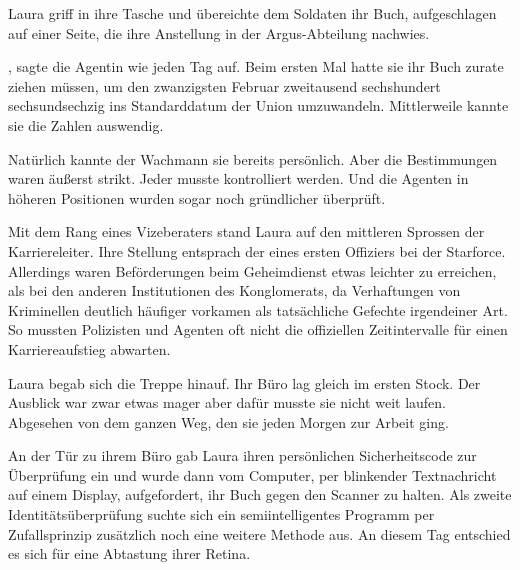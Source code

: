 Laura griff in ihre Tasche und übereichte dem Soldaten ihr Buch, aufgeschlagen auf einer Seite, die ihre Anstellung in der Argus-Abteilung nachwies.

\par

, sagte die Agentin wie jeden Tag auf. Beim ersten Mal hatte sie ihr Buch zurate ziehen müssen, um den zwanzigsten Februar zweitausend sechshundert sechsundsechzig ins Standarddatum der Union umzuwandeln. Mittlerweile kannte sie die Zahlen auswendig.

\par

Natürlich kannte der Wachmann sie bereits persönlich. Aber die Bestimmungen waren äußerst strikt. Jeder musste kontrolliert werden. Und die Agenten in höheren Positionen wurden sogar noch gründlicher überprüft.

\par

Mit dem Rang eines Vizeberaters stand Laura auf den mittleren Sprossen der Karriereleiter. Ihre Stellung entsprach der eines ersten Offiziers bei der Starforce. Allerdings waren Beförderungen beim Geheimdienst etwas leichter zu erreichen, als bei den anderen Institutionen des Konglomerats, da Verhaftungen von Kriminellen deutlich häufiger vorkamen als tatsächliche Gefechte irgendeiner Art. So mussten Polizisten und Agenten oft nicht die offiziellen Zeitintervalle für einen Karriereaufstieg abwarten.

\par

Laura begab sich die Treppe hinauf. Ihr Büro lag gleich im ersten Stock. Der Ausblick war zwar etwas mager aber dafür musste sie nicht weit laufen. Abgesehen von dem ganzen Weg, den sie jeden Morgen zur Arbeit ging.

\par

An der Tür zu ihrem Büro gab Laura ihren persönlichen Sicherheitscode zur Überprüfung ein und wurde dann vom Computer, per blinkender Textnachricht auf einem Display, aufgefordert, ihr Buch gegen den Scanner zu halten. Als zweite Identitätsüberprüfung suchte sich ein semiintelligentes Programm per Zufallsprinzip zusätzlich noch eine weitere Methode aus. An diesem Tag entschied es sich für eine Abtastung ihrer Retina.

\par

